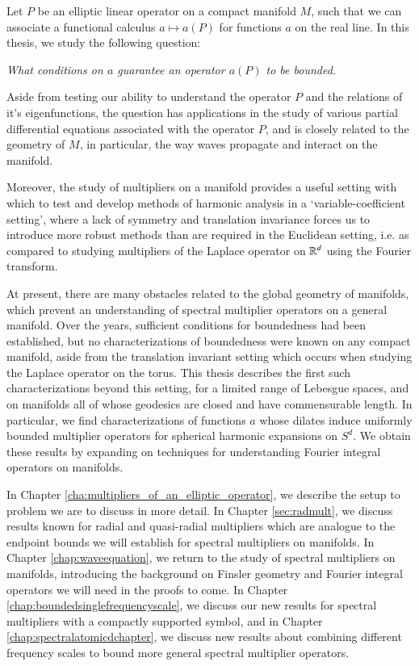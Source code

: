 
Let $P$ be an elliptic linear operator on a compact manifold $M$, such that we can associate a functional calculus $a \mapsto a(P)$ for functions $a$ on the real line. In this thesis, we study the following question:  
%
\begin{changemargin}{2cm}{2cm}
\begin{center}
  \emph{What conditions on $a$ guarantee an operator $a(P)$ to be bounded.}
\end{center}
\end{changemargin}
%
Aside from testing our ability to understand the operator $P$ and the relations of it's eigenfunctions, the question has applications in the study of various partial differential equations associated with the operator $P$, and is closely related to the geometry of $M$, in particular, the way waves propagate and interact on the manifold.

Moreover, the study of multipliers on a manifold provides a useful setting with which to test and develop methods of harmonic analysis in a `variable-coefficient setting', where a lack of symmetry and translation invariance forces us to introduce more robust methods than are required in the Euclidean setting, i.e. as compared to studying multipliers of the Laplace operator on $\operatorname{\mathbb{R}}^d$ using the Fourier transform.

At present, there are many obstacles related to the global geometry of manifolds, which prevent an understanding of spectral multiplier operators on a general manifold. Over the years, sufficient conditions for boundedness had been established, but no characterizations of boundedness were known on any compact manifold, aside from the translation invariant setting which occurs when studying the Laplace operator on the torus. This thesis describes the first such characterizations beyond this setting, for a limited range of Lebesgue spaces, and on manifolds all of whose geodesics are closed and have commensurable length. In particular, we find characterizations of functions $a$ whose dilates induce uniformly bounded multiplier operators for spherical harmonic expansions on $S^d$. We obtain these results by expanding on techniques for understanding Fourier integral operators on manifolds.

In Chapter \ref{cha:multipliers_of_an_elliptic_operator}, we describe the setup to problem we are to discuss in more detail. In Chapter \ref{sec:radmult}, we discuss results known for radial and quasi-radial multipliers which are analogue to the endpoint bounds we will establish for spectral multipliers on manifolds. In Chapter \ref{chap:waveequation}, we return to the study of spectral multipliers on manifolds, introducing the background on Finsler geometry and Fourier integral operators we will need in the proofs to come. In Chapter \ref{chap:boundedsinglefrequencyscale}, we discuss our new results for spectral multipliers with a compactly supported symbol, and in Chapter \ref{chap:spectralatomicdchapter}, we discuss new results about combining different frequency scales to bound more general spectral multiplier operators.